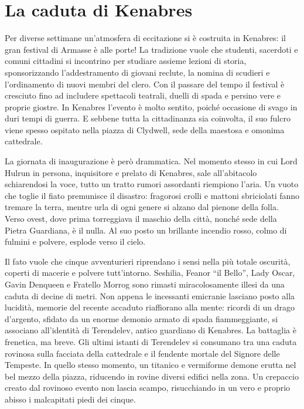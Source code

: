 \chapter{La caduta di Kenabres}
\label{chp:cap1}

Per diverse settimane un'atmosfera di eccitazione si \`e costruita in Kenabres: il gran festival di Armasse \`e alle porte! La tradizione vuole che studenti, sacerdoti e comuni cittadini si incontrino per studiare assieme lezioni di storia, sponsorizzando l'addestramento di giovani reclute, la nomina di scudieri e l'ordinamento di nuovi membri del clero. Con il passare del tempo il festival \`e cresciuto fino ad includere spettacoli teatrali, duelli di spada e persino vere e proprie giostre. In Kenabres l'evento \`e molto sentito, poich\'e occasione di svago in duri tempi di guerra. E sebbene tutta la cittadinanza sia coinvolta, il suo fulcro viene spesso ospitato nella piazza di Clydwell, sede della maestosa e omonima cattedrale.

La giornata di inaugurazione \`e per\`o drammatica. Nel momento stesso in cui Lord Hulrun in persona, inquisitore e prelato di Kenabres, sale all'abitacolo schiarendosi la voce, tutto un tratto rumori assordanti riempiono l'aria. Un vuoto che toglie il fiato premunisce il disastro: fragorosi crolli e mattoni sbriciolati fanno tremare la terra, mentre urla di ogni genere si alzano dal pienone della folla. Verso ovest, dove prima torreggiava il maschio della citt\`a, nonch\'e sede della Pietra Guardiana, \`e il nulla. Al suo posto un brillante incendio rosso, colmo di fulmini e polvere, esplode verso il cielo.

Il fato vuole che cinque avventurieri riprendano i sensi nella pi\`u totale oscurit\`a, coperti di macerie e polvere tutt'intorno. Seshilia, Feanor ``il Bello'', Lady Oscar, Gavin Denqueen e Fratello Morrog sono rimasti miracolosamente illesi da una caduta di decine di metri. Non appena le incessanti emicranie lasciano posto alla lucidit\`a, memorie del recente accaduto riaffiorano alla mente: ricordi di un drago d'argento, sfidato da un enorme demonio armato di spada fiammeggiante, si associano all'identit\`a di Terendelev, antico guardiano di Kenabres. La battaglia \`e frenetica, ma breve. Gli ultimi istanti di Terendelev si consumano tra una caduta rovinosa sulla facciata della cattedrale e il fendente mortale del Signore delle Tempeste. In quello stesso momento, un titanico e vermiforme demone erutta nel bel mezzo della piazza, riducendo in rovine diversi edifici nella zona. Un crepaccio creato dal rovinoso evento non lascia scampo, risucchiando in un vero e proprio abisso i malcapitati piedi dei cinque.

